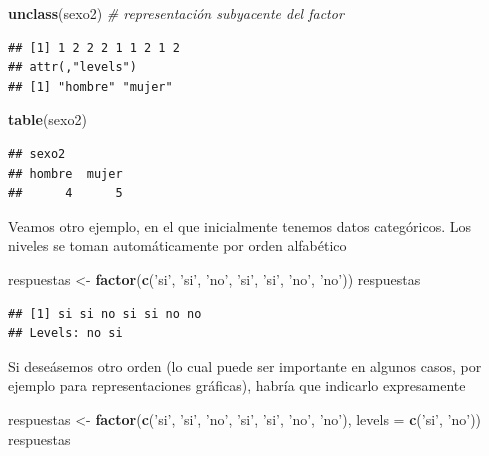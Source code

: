 \documentclass[]{book}
\newenvironment{Shaded}{\begin{snugshade}}{\end{snugshade}}
\newcommand{\CommentTok}[1]{\textcolor[rgb]{0.56,0.35,0.01}{\textit{#1}}}
\newcommand{\DataTypeTok}[1]{\textcolor[rgb]{0.13,0.29,0.53}{#1}}
\newcommand{\KeywordTok}[1]{\textcolor[rgb]{0.13,0.29,0.53}{\textbf{#1}}}
\newcommand{\NormalTok}[1]{#1}
\newcommand{\StringTok}[1]{\textcolor[rgb]{0.31,0.60,0.02}{#1}}
\begin{document}
\begin{Shaded}
\begin{Highlighting}[]
\KeywordTok{unclass}\NormalTok{(sexo2)  }\CommentTok{# representación subyacente del factor}
\end{Highlighting}
\end{Shaded}

\begin{verbatim}
## [1] 1 2 2 2 1 1 2 1 2
## attr(,"levels")
## [1] "hombre" "mujer"
\end{verbatim}

\begin{Shaded}
\begin{Highlighting}[]
\KeywordTok{table}\NormalTok{(sexo2)}
\end{Highlighting}
\end{Shaded}

\begin{verbatim}
## sexo2
## hombre  mujer 
##      4      5
\end{verbatim}

Veamos otro ejemplo, en el que inicialmente tenemos datos categóricos. Los
niveles se toman automáticamente por orden alfabético

\begin{Shaded}
\begin{Highlighting}[]
\NormalTok{respuestas <-}\StringTok{ }\KeywordTok{factor}\NormalTok{(}\KeywordTok{c}\NormalTok{(}\StringTok{'si'}\NormalTok{, }\StringTok{'si'}\NormalTok{, }\StringTok{'no'}\NormalTok{, }\StringTok{'si'}\NormalTok{, }\StringTok{'si'}\NormalTok{, }\StringTok{'no'}\NormalTok{, }\StringTok{'no'}\NormalTok{))}
\NormalTok{respuestas}
\end{Highlighting}
\end{Shaded}

\begin{verbatim}
## [1] si si no si si no no
## Levels: no si
\end{verbatim}

Si deseásemos otro orden (lo cual puede ser importante en algunos casos, por ejemplo
para representaciones gráficas), habría que indicarlo expresamente

\begin{Shaded}
\begin{Highlighting}[]
\NormalTok{respuestas <-}\StringTok{ }\KeywordTok{factor}\NormalTok{(}\KeywordTok{c}\NormalTok{(}\StringTok{'si'}\NormalTok{, }\StringTok{'si'}\NormalTok{, }\StringTok{'no'}\NormalTok{, }\StringTok{'si'}\NormalTok{, }\StringTok{'si'}\NormalTok{, }\StringTok{'no'}\NormalTok{, }\StringTok{'no'}\NormalTok{), }\DataTypeTok{levels =} \KeywordTok{c}\NormalTok{(}\StringTok{'si'}\NormalTok{, }\StringTok{'no'}\NormalTok{))}
\NormalTok{respuestas}
\end{Highlighting}
\end{Shaded}
\end{document}
